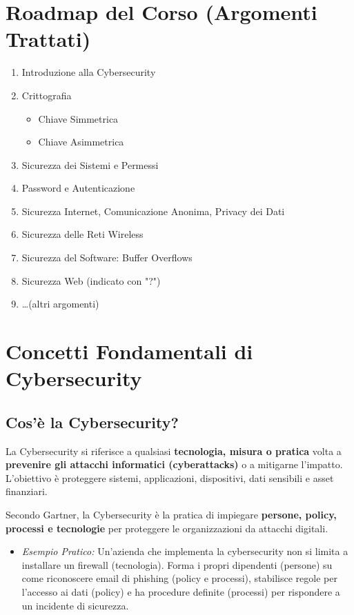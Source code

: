 \documentclass{article}
\begin{document}
\section{Roadmap del Corso (Argomenti Trattati)}
\begin{enumerate}
    \item Introduzione alla Cybersecurity
    \item Crittografia
    \begin{itemize}
        \item Chiave Simmetrica
        \item Chiave Asimmetrica
    \end{itemize}
    \item Sicurezza dei Sistemi e Permessi
    \item Password e Autenticazione
    \item Sicurezza Internet, Comunicazione Anonima, Privacy dei Dati
    \item Sicurezza delle Reti Wireless
    \item Sicurezza del Software: Buffer Overflows
    \item Sicurezza Web (indicato con "?")
    \item \dots (altri argomenti)
\end{enumerate}

\section{Concetti Fondamentali di Cybersecurity}

\subsection{Cos'è la Cybersecurity?}
La Cybersecurity si riferisce a qualsiasi \textbf{tecnologia, misura o pratica} volta a \textbf{prevenire gli attacchi informatici (cyberattacks)} o a mitigarne l'impatto.
L'obiettivo è proteggere sistemi, applicazioni, dispositivi, dati sensibili e asset finanziari.

Secondo Gartner, la Cybersecurity è la pratica di impiegare \textbf{persone, policy, processi e tecnologie} per proteggere le organizzazioni da attacchi digitali.
\begin{itemize}
    \item \textit{Esempio Pratico:} Un'azienda che implementa la cybersecurity non si limita a installare un firewall (tecnologia). Forma i propri dipendenti (persone) su come riconoscere email di phishing (policy e processi), stabilisce regole per l'accesso ai dati (policy) e ha procedure definite (processi) per rispondere a un incidente di sicurezza.
\end{itemize}
\end{document}
